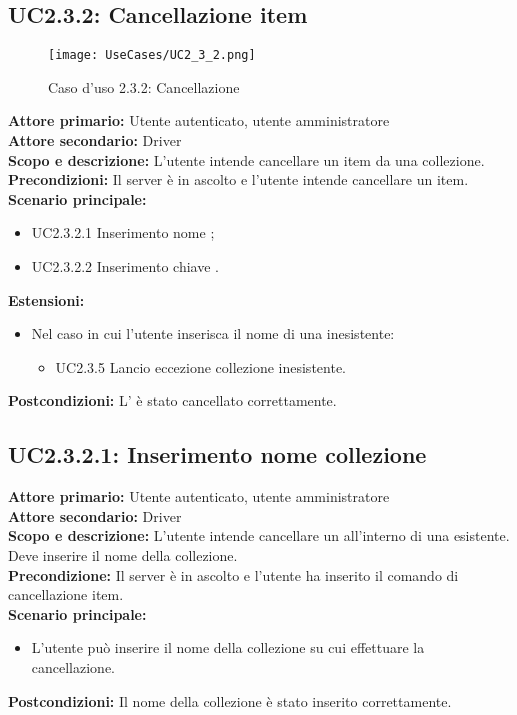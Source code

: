 \documentclass{scalatekids-article}
\begin{document}
\subsection{UC2.3.2: Cancellazione item}

\begin{figure}[H]
  \begin{center}
    \texttt{[image: UseCases/UC2\_3\_2.png]}
    \caption*{Caso d'uso 2.3.2: Cancellazione }
  \end{center}
\end{figure}
\textbf{Attore primario:} Utente autenticato, utente amministratore\\
\textbf{Attore secondario:} Driver\\
\textbf{Scopo e descrizione:} L'utente intende cancellare un item da una collezione.\\
\textbf{Precondizioni:} Il server è in ascolto e l'utente intende cancellare un item.\\
\textbf{Scenario principale:}
\begin{itemize}
\item UC2.3.2.1 Inserimento nome ;
\item UC2.3.2.2 Inserimento chiave .
\end{itemize}
\textbf{Estensioni:}
\begin{itemize}
\item Nel caso in cui l'utente inserisca il nome di una  inesistente:
  \begin{itemize}
  \item UC2.3.5 Lancio eccezione collezione inesistente.
  \end{itemize}
\end{itemize}
\textbf{Postcondizioni:} L' è stato cancellato correttamente.

\subsection{UC2.3.2.1: Inserimento nome collezione}

\textbf{Attore primario:} Utente autenticato, utente amministratore\\
\textbf{Attore secondario:} Driver\\
\textbf{Scopo e descrizione:} L'utente intende cancellare un  all'interno di una  esistente. Deve inserire il nome della collezione.\\
\textbf{Precondizione:} Il server è in ascolto e l'utente ha inserito il comando di cancellazione item.\\
\textbf{Scenario principale:}
\begin{itemize}
\item L'utente può inserire il nome della collezione su cui effettuare la cancellazione.
\end{itemize}
\textbf{Postcondizioni:} Il nome della collezione è stato inserito correttamente.
\end{document}
